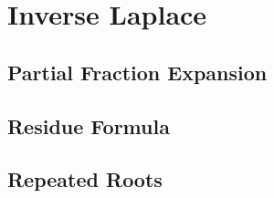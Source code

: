 \section*{Inverse Laplace}
\subsection*{Partial Fraction Expansion}
\subsection*{Residue Formula}
\subsection*{Repeated Roots}